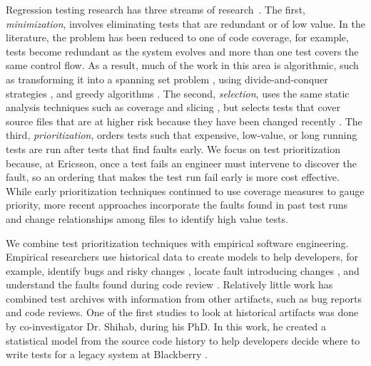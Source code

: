 Regression testing research has three streams of research~\cite{Yoo2012STVR}.
%
%
The first, {\it minimization}, involves eliminating tests that are redundant or
of low value. In the literature, the problem has been reduced to one of code
coverage, for example, tests become redundant as the system evolves and more
than one test covers the same control flow. As a result, much of the work in
this area is algorithmic, such as transforming it into a spanning set problem
\cite{Marre2003TSE}, using divide-and-conquer strategies \cite{Chen1996IPL},
and greedy algorithms \cite{Tallam2005SENotes}. 
%
The second, {\it selection}, uses the same static analysis techniques such as
coverage \cite{Taha1989COMPSAC} and slicing \cite{Jeffrey2006COMPSAC}, but
selects tests that cover source files that are at higher risk because they have
been changed recently \cite{Rothermel1994ICSE}. 
%
The third, {\it prioritization}, orders tests such that expensive, low-value,
or long running tests are run after tests that find faults early.  We
focus on test prioritization because, at Ericsson, once a test fails an
engineer must intervene to discover the fault, so an ordering that makes the
test run fail early is more cost effective.
While early prioritization techniques continued to use coverage measures to
gauge priority, more recent approaches incorporate the faults found in past
test runs \cite{Kim2002ICSE} and change relationships among files
\cite{Sherriff2007ISSRE} to identify high value tests. 
%


We combine test prioritization techniques with empirical software engineering.
Empirical researchers use historical data to create models to help developers,
for example, identify bugs and risky changes \cite{DAmbros2010MSR}, locate
fault introducing changes \cite{Kim2006ASE}, and understand the faults found
during code review \cite{Rigby2014TOSEM}.
Relatively little work has combined test archives with information from other
artifacts, such as bug reports and code reviews. One of the first studies to
look at historical artifacts was done by co-investigator Dr. Shihab, during his
PhD. In this work, he created a statistical model from the source code history
to help developers decide where to write tests for a legacy system at
Blackberry \cite{Shihab2011SPE}.


